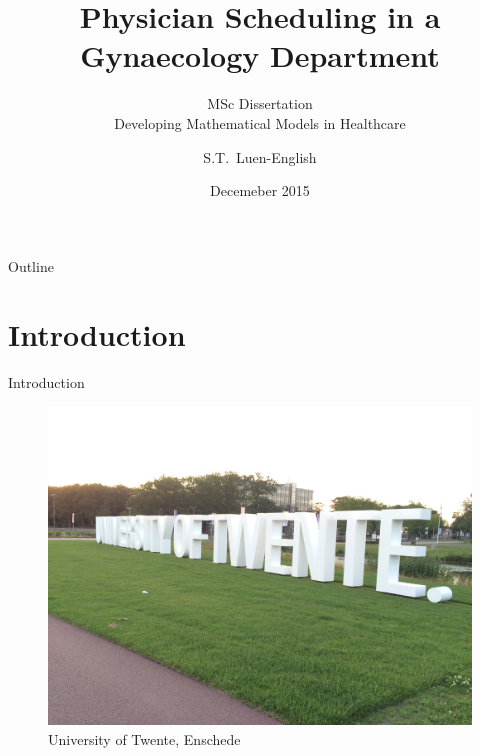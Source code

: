 \documentclass{beamer}
\title[Physician Scheduling]{Physician Scheduling in a Gynaecology Department}
\subtitle{MSc Dissertation\\Developing Mathematical Models in Healthcare}
\author{S.T.~Luen-English}
\institute[Cardiff University]
{
  Department of Mathematics\\
  Cardiff University}
\date{Decemeber 2015}
\begin{document}
\begin{frame}
  \titlepage
\end{frame}

\begin{frame}{Outline}
\setcounter{tocdepth}{1}
  \tableofcontents
\end{frame}

\section{Introduction}

\begin{frame}{Introduction}
    \begin{figure}
        \centering
        \includegraphics[width=0.6\linewidth]{img/utwente}
        \caption{University of Twente, Enschede}
    \end{figure}
\end{frame}
\end{document}
